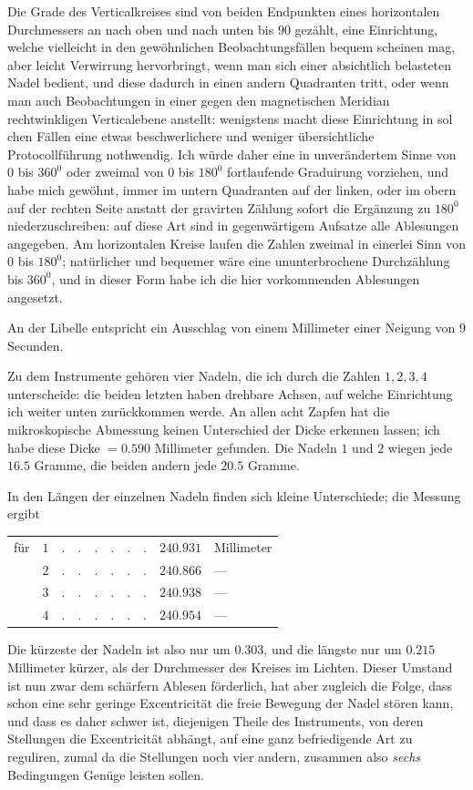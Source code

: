 Die Grade des Verticalkreises sind von beiden Endpunkten eines horizontalen Durchmessers an nach oben und nach unten bis $90$ gezählt, eine Einrichtung, welche vielleicht in den gewöhnlichen Beobachtungsfällen bequem scheinen mag, aber leicht Verwirrung hervorbringt, wenn man sich einer absichtlich belasteten Nadel bedient, und diese dadurch in einen andern Quadranten tritt, oder wenn man auch Beobachtungen in einer gegen den magnetischen Meridian rechtwinkligen Verticalebene anstellt: wenigstens macht diese Einrichtung in sol%
%
chen Fällen eine etwas beschwerlichere und weniger übersichtliche Protocollführung nothwendig. Ich würde daher eine in unverändertem Sinne von $0$ bis $360^0$ oder zweimal von $0$ bis $180^0$ fortlaufende Graduirung vorziehen, und habe mich gewöhnt, immer im untern Quadranten auf der linken, oder im obern auf der rechten Seite anstatt der gravirten Zählung sofort die Ergänzung zu $180^0$ niederzuschreiben: auf diese Art sind in gegenwärtigem Aufsatze alle Ablesungen angegeben. Am horizontalen Kreise laufen die Zahlen zweimal in einerlei Sinn von $0$ bis $180^0$; natürlicher und bequemer wäre eine ununterbrochene Durchzählung bis $360^0$, und in dieser Form habe ich die hier vorkommenden Ablesungen angesetzt.

An der Libelle entspricht ein Ausschlag von einem Millimeter einer Neigung von $9$ Secunden.

Zu dem Instrumente gehören vier Nadeln, die ich durch die Zahlen $1,2,3,4$ unterscheide: die beiden letzten haben drehbare Achsen, auf welche Einrichtung ich weiter unten zurückkommen werde. An allen acht Zapfen hat die mikroskopische Abmessung keinen Unterschied der Dicke erkennen lassen; ich habe diese Dicke $=0.590$ Millimeter gefunden. Die Nadeln $1$ und $2$ wiegen jede $16.5$ Gramme, die beiden andern jede $20.5$ Gramme.

In den Längen der einzelnen Nadeln finden sich kleine Unterschiede; die Messung ergibt
\begin{center}
\begin{tabular}{crcrl}
für &$1$&$.\quad.\quad.\quad.\quad.\quad.$&$240.931$&Millimeter\\
&$2$&$.\quad.\quad.\quad.\quad.\quad.$&$240.866$&—\\
&$3$&$.\quad.\quad.\quad.\quad.\quad.$&$240.938$&—\\
&$4$&$.\quad.\quad.\quad.\quad.\quad.$&$240.954$&—
\end{tabular}
\end{center}
Die kürzeste der Nadeln ist also nur um $0.303$, und die längste nur um $0.215$ Millimeter kürzer, als der Durchmesser des Kreises im Lichten. Dieser Umstand ist nun zwar dem schärfern Ablesen förderlich, hat aber zugleich die Folge, dass schon eine sehr geringe Excentricität die freie Bewegung der Nadel stören kann, und dass es daher schwer ist, diejenigen Theile des Instruments, von deren Stellungen die Excentricität abhängt, auf eine ganz befriedigende Art zu reguliren, zumal da die Stellungen noch vier andern, zusammen also \textit{sechs} Bedingungen Genüge leisten sollen.
